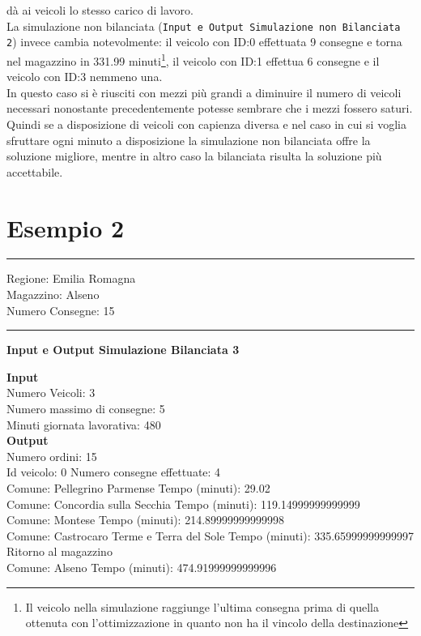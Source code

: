 \documentclass[a4paper,12pt]{report}
\begin{document}
dà ai veicoli lo stesso carico di lavoro.\\
La simulazione non bilanciata (\texttt{Input e Output Simulazione non Bilanciata 2}) invece cambia notevolmente: il veicolo con ID:0 effettuata 9 consegne
e torna nel magazzino in 331.99 minuti\footnote{Il veicolo nella simulazione raggiunge l'ultima consegna prima di quella ottenuta con l'ottimizzazione
in quanto non ha il vincolo della destinazione}, il veicolo con ID:1 effettua 6 consegne e il veicolo con 
ID:3 nemmeno una.\\
In questo caso si è riusciti con mezzi più grandi a diminuire il numero di veicoli necessari nonostante
precedentemente potesse sembrare che i mezzi fossero saturi.\\
Quindi se a disposizione di veicoli con capienza diversa e nel caso in cui si voglia sfruttare 
ogni minuto a disposizione la simulazione non bilanciata offre la soluzione migliore, mentre in 
altro caso la bilanciata risulta la soluzione più accettabile.\\

\section{Esempio 2}
\hrule
Regione: Emilia Romagna\\
Magazzino: Alseno\\
Numero Consegne: 15\\
\hrule
\begin{center}
\textbf{Input e Output Simulazione Bilanciata 3}
\end{center}
\textbf{Input}\\
Numero Veicoli: 3\\
Numero massimo di consegne: 5\\
Minuti giornata lavorativa: 480\\
\textbf{Output}\\
Numero ordini: 15\\

Id veicolo: 0	Numero consegne effettuate: 4\\
Comune: Pellegrino Parmense	 Tempo (minuti): 29.02\\
Comune: Concordia sulla Secchia	 Tempo (minuti): 119.14999999999999\\
Comune: Montese	 Tempo (minuti): 214.89999999999998\\
Comune: Castrocaro Terme e Terra del Sole	 Tempo (minuti): 335.65999999999997\\
Ritorno al magazzino\\
Comune: Alseno	 Tempo (minuti): 474.91999999999996\\
\end{document}
